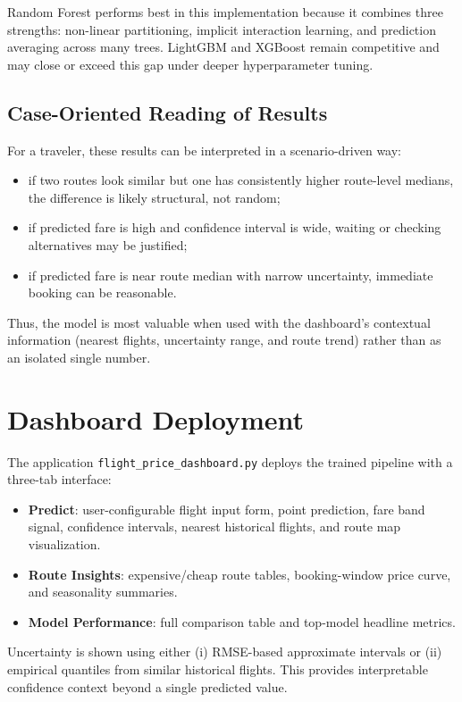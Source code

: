 \documentclass[conference]{IEEEtran}
\begin{document}
Random Forest performs best in this implementation because it combines three strengths: non-linear partitioning, implicit interaction learning, and prediction averaging across many trees. LightGBM and XGBoost remain competitive and may close or exceed this gap under deeper hyperparameter tuning.

\subsection{Case-Oriented Reading of Results}
For a traveler, these results can be interpreted in a scenario-driven way:
\begin{itemize}
\item if two routes look similar but one has consistently higher route-level medians, the difference is likely structural, not random;
\item if predicted fare is high and confidence interval is wide, waiting or checking alternatives may be justified;
\item if predicted fare is near route median with narrow uncertainty, immediate booking can be reasonable.
\end{itemize}

Thus, the model is most valuable when used with the dashboard's contextual information (nearest flights, uncertainty range, and route trend) rather than as an isolated single number.

\section{Dashboard Deployment}
The application \texttt{flight\_price\_dashboard.py} deploys the trained pipeline with a three-tab interface:
\begin{itemize}
\item \textbf{Predict}: user-configurable flight input form, point prediction, fare band signal, confidence intervals, nearest historical flights, and route map visualization.
\item \textbf{Route Insights}: expensive/cheap route tables, booking-window price curve, and seasonality summaries.
\item \textbf{Model Performance}: full comparison table and top-model headline metrics.
\end{itemize}

Uncertainty is shown using either (i) RMSE-based approximate intervals or (ii) empirical quantiles from similar historical flights. This provides interpretable confidence context beyond a single predicted value.
\end{document}
